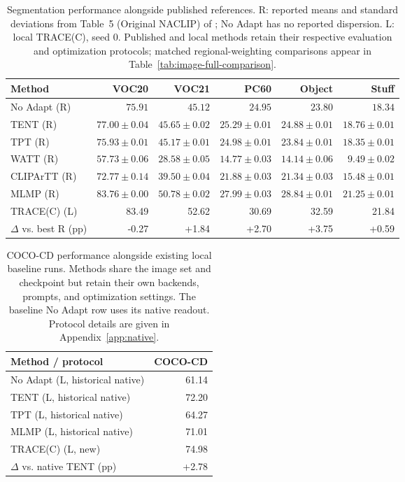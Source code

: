 \begin{table}[t]
\caption{Segmentation performance alongside published references. R: reported means and standard deviations from Table~5 (Original NACLIP) of \citet{noori2025mlmp}; No Adapt has no reported dispersion. L: local TRACE(C), seed 0. Published and local methods retain their respective evaluation and optimization protocols; matched regional-weighting comparisons appear in Table~\ref{tab:image-full-comparison}.}
\label{tab:image-full-reference}
\centering\small
\begin{tabular}{@{}lrrrrr@{}}
\toprule
Method & VOC20 & VOC21 & PC60 & Object & Stuff \\
\midrule
No Adapt (R) & $75.91$ & $45.12$ & $24.95$ & $23.80$ & $18.34$ \\
TENT (R) & $77.00 \pm 0.04$ & $45.65 \pm 0.02$ & $25.29 \pm 0.01$ & $24.88 \pm 0.01$ & $18.76 \pm 0.01$ \\
TPT (R) & $75.93 \pm 0.01$ & $45.17 \pm 0.01$ & $24.98 \pm 0.01$ & $23.84 \pm 0.01$ & $18.35 \pm 0.01$ \\
WATT (R) & $57.73 \pm 0.06$ & $28.58 \pm 0.05$ & $14.77 \pm 0.03$ & $14.14 \pm 0.06$ & $9.49 \pm 0.02$ \\
CLIPArTT (R) & $72.77 \pm 0.14$ & $39.50 \pm 0.04$ & $21.88 \pm 0.03$ & $21.34 \pm 0.03$ & $15.48 \pm 0.01$ \\
MLMP (R) & $83.76 \pm 0.00$ & $50.78 \pm 0.02$ & $27.99 \pm 0.03$ & $28.84 \pm 0.01$ & $21.25 \pm 0.01$ \\
\midrule
TRACE(C) (L) & 83.49 & 52.62 & 30.69 & 32.59 & 21.84 \\
$\Delta$ vs. best R (pp) & -0.27 & +1.84 & +2.70 & +3.75 & +0.59 \\
\bottomrule
\end{tabular}
\end{table}
\begin{table}[t]
\caption{COCO-CD performance alongside existing local baseline runs. Methods share the image set and checkpoint but retain their own backends, prompts, and optimization settings. The baseline No Adapt row uses its native readout. Protocol details are given in Appendix~\ref{app:native}.}
\label{tab:image-full-cd-reference}
\centering\small
\begin{tabular}{@{}lr@{}}
\toprule
Method / protocol & COCO-CD \\
\midrule
No Adapt (L, historical native) & 61.14 \\
TENT (L, historical native) & 72.20 \\
TPT (L, historical native) & 64.27 \\
MLMP (L, historical native) & 71.01 \\
\midrule
TRACE(C) (L, new) & 74.98 \\
$\Delta$ vs. native TENT (pp) & +2.78 \\
\bottomrule
\end{tabular}
\end{table}
